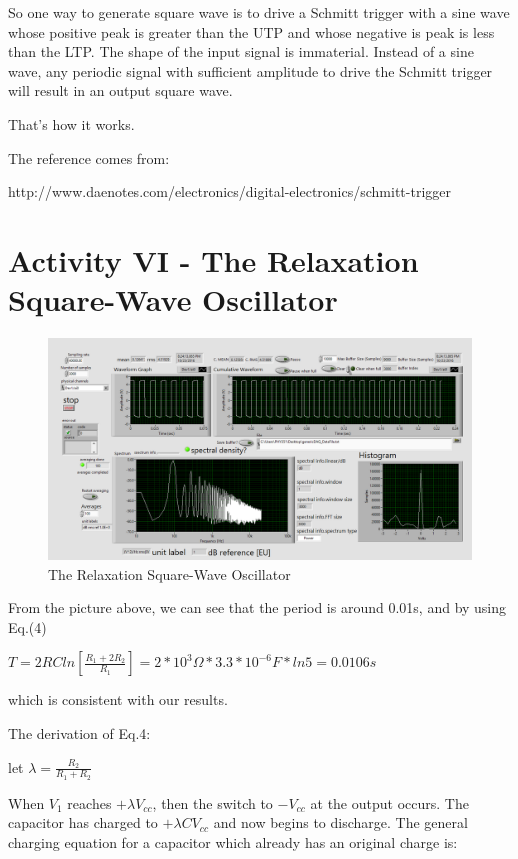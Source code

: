 \documentclass[11pt]{article}
\begin{document}
\vbox{}

So one way to generate square wave is to drive a Schmitt trigger with a sine wave whose positive peak is greater than the UTP and whose negative is peak is less than the LTP. The shape of the input signal is immaterial. Instead of a sine wave, any periodic signal with sufficient amplitude to drive the Schmitt trigger will result in an output square wave.

\vbox{}

That's how it works.

\vbox{}

The reference comes from:

http://www.daenotes.com/electronics/digital-electronics/schmitt-trigger

\section{Activity VI - The Relaxation Square-Wave Oscillator}

\begin{figure}[H]
 \begin{center}
  \includegraphics[width=\linewidth/1]{act6}
  \caption{The Relaxation Square-Wave Oscillator}
  \label{fig:act6}
 \end{center}
\end{figure}

From the picture above, we can see that the period is around 0.01s, and by using Eq.(4)

$T=2RCln[\frac{R_{1}+2R_{2}}{R_{1}}]=2*10^3\Omega*3.3*10^{-6}F*ln5=0.0106s$

which is consistent with our results.

The derivation of Eq.4:

let $\lambda=\frac{R_{2}}{R_{1}+R_{2}}$

When $V_{1}$ reaches $+\lambda V_{cc}$, then the switch to $-V_{cc}$ at the output occurs. The capacitor has charged to $+\lambda CV_{cc}$ and now begins to discharge. The general charging equation for a capacitor which already has an original charge is:
\end{document}
